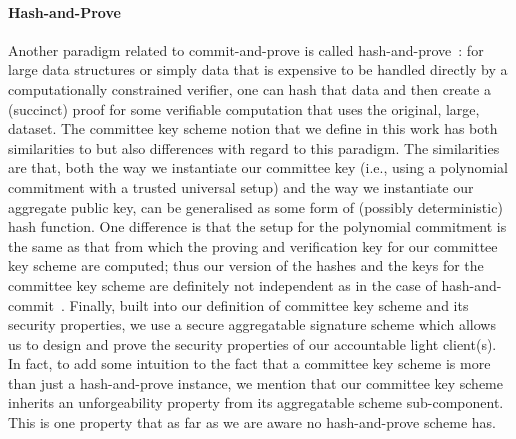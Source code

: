 \paragraph{Hash-and-Prove} Another paradigm related to commit-and-prove is called hash-and-prove~\cite{HP_paper}: for large data structures or simply data that is expensive to be 
handled directly by a computationally constrained verifier, one can hash that data and then create a (succinct) proof for some verifiable computation that uses 
the original, large, dataset. The committee key scheme notion that we define in this work has both similarities to but also differences with regard to this 
paradigm. The similarities are that, both the way we instantiate our committee key (i.e., using a polynomial commitment 
with a trusted universal setup) and the way we instantiate our aggregate public key, can be generalised as some form of (possibly deterministic) 
hash function. One difference is that the setup for the polynomial commitment is the same as that from which the proving and verification key for our committee key scheme are 
computed; thus our version of the hashes and the keys for the committee key scheme are definitely not independent as in the case of hash-and-commit~\cite{HP_paper}. Finally, 
built into our definition of committee key scheme and its security properties, we use a secure aggregatable signature scheme which allows us to design and 
prove the security properties of our accountable light client(s). In fact, to add some intuition to the fact that a committee key scheme is more than 
just a hash-and-prove instance, we mention that our committee key scheme inherits an unforgeability property from its aggregatable scheme sub-component. 
This is one property that as far as we are aware no hash-and-prove scheme has. \\
\vspace{-0.1in}


